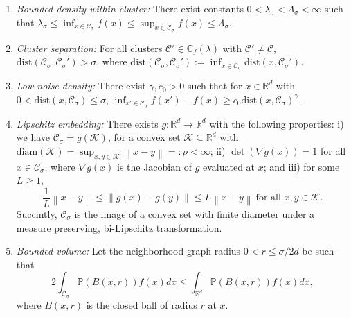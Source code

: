 \documentclass[11pt,twoside]{article}
\newcommand{\diam}{\rho}
\newcommand{\Reals}{\mathbb{R}}
\newcommand{\Rd}{\Reals^d}
\newcommand{\norm}[1]{\left\lVert#1\right\rVert}
\newcommand{\1}{\mathbf{1}}
\newcommand{\dist}{\mathrm{dist}}
\newcommand{\Pbb}{\mathbb{P}}
\newcommand{\Cbb}{\mathbb{C}}
\newcommand{\Cset}{\mathcal{C}}
\newcommand{\Csig}{\Cset_{\sigma}}
\begin{document}
\begin{enumerate}[label=(A\arabic*)]
\item
  \label{asmp: bounded_density}
  \emph{Bounded density within cluster:} There exist constants
  $0<\lambda_{\sigma}< \Lambda_{\sigma}<\infty$ such that 
  $\lambda_{\sigma} \leq \inf_{x \in \Csig} f(x) \leq \sup_{x \in \Csig} f(x)
  \leq \Lambda_{\sigma}$. 
  
\item
  \label{asmp: cluster_separation}
  \emph{Cluster separation:}
  For all clusters $\Cset' \in \Cbb_f(\lambda)$ with $\Cset' \not= \Cset$, 
  $\dist(\Csig,\Csig') > \sigma$, where $\dist(\Csig,\Csig') := \inf_{x
    \in \Csig} \dist(x,\Csig')$.  
    
\item 
  \label{asmp: low_noise_density}
  \emph{Low noise density:} There exist $\gamma,c_0 > 0$ such that for 
  $x \in \Rd$ with $0 < \dist(x, \Csig) \leq \sigma$,   
  $\inf_{x' \in \Csig} f(x') - f(x) \geq  c_0 \dist(x, \Csig)^{\gamma}$.
	
\item
  \label{asmp: embedding}
  \emph{Lipschitz embedding:}
  There exists $g: \Reals^d \to \Reals^d$ with the following properties: i)
  we have $\Csig = g(\mathcal{K})$, for a convex set $\mathcal{K} \subseteq \Rd$
  with $\mathrm{diam}(\mathcal{K}) = \sup_{x,y \in \mathcal{K}}\norm{x - y} =:
  \diam < \infty$; ii) $\det(\nabla g (x)) = 1$ for all $x \in \Csig$, where
  $\nabla g(x)$ is the Jacobian of $g$ evaluated at $x$; and iii) for some $L
  \geq 1$,   
  \begin{equation*}
    \frac{1}{L}\norm{x - y} \leq \norm{g(x) - g(y)} \leq L \norm{x - y} ~
    \text{for all $x,y \in \mathcal{K}$}. 
  \end{equation*}
  Succintly, $\Csig$ is the image of a convex set with finite diameter 
  under a  measure preserving, bi-Lipschitz transformation. 

\item
  \label{asmp: bounded_volume}
  \emph{Bounded volume:}
  Let the neighborhood graph radius $0 < r \leq \sigma/2d$ be such that
  \begin{equation*}
    2 \int_{\Csig} \Pbb(B(x,r)) f(x) dx \leq \int_{\Rd} \Pbb(B(x,r)) f(x) dx,
  \end{equation*}
  where $B(x,r)$ is the closed ball of radius $r$ at $x$.
\end{enumerate}
\end{document}

